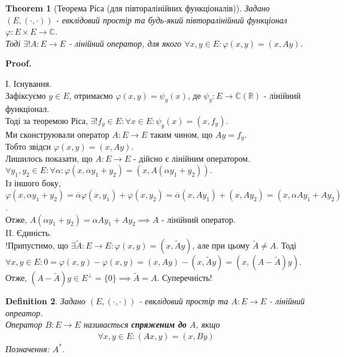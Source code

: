 \documentclass[a4paper, 10pt]{article}
\makeatletter
\def\qed{$\blacksquare$}
\theoremstyle{theoremdd}
\newtheorem{theorem}{Theorem}[subsection]
\theoremstyle{theoremdd}
\newtheorem{definition}[theorem]{Definition}
\theoremstyle{theoremdd}
\theoremstyle{theoremdd}
\theoremstyle{theoremdd}
\theoremstyle{theoremdd}
\theoremstyle{theoremdd}
\theoremstyle{theoremdd}
\renewenvironment{proof}[1][Proof.\\]{\par
\pushQED{\hfill \qed}%
\normalfont \topsep6\p@\@plus6\p@\relax
\trivlist
\item\relax
{\bfseries
#1\@addpunct{.}}\hspace\labelsep\ignorespaces
}{%
\popQED\endtrivlist\@endpefalse
}
\makeatother
\begin{document}
\begin{theorem}[Теорема Ріса (для півторалінійних функціоналів)]
Задано $(E,(\cdot,\cdot))$ - евклідовий простір та будь-який півторалінійний функціонал $\varphi: E \times E \to \mathbb{C}$.\\
Тоді $\exists! A: E \to E$ - лінійний оператор, для якого $\forall x,y \in E: \varphi(x,y) = (x,Ay)$.
\end{theorem}

\begin{proof}
I. Існування.\\
Зафіксуємо $y \in E$, отримаємо $\varphi(x,y) = \psi_y(x)$, де $\psi_y: E \to \mathbb{C} (\mathbb{R})$ - лінійний функціонал.\\
Тоді за теоремою Ріса, $\exists! f_y \in E: \forall x \in E: \psi_y(x) = (x,f_y)$.\\
Ми сконструювали оператор $A: E \to E$ таким чином, що $Ay = f_y$.\\
Тобто звідси $\varphi(x,y) = (x,Ay)$.\\
Лишилось показати, що $A: E \to E$ - дійсно є лінійним оператором.\\
$\forall y_1,y_2 \in E: \forall \alpha: \varphi(x,\alpha y_1 + y_2) = (x,A(\alpha y_1 + y_2))$.\\
Із іншого боку, $\varphi(x,\alpha y_1 + y_2) = \overline{\alpha} \varphi(x,y_1) + \varphi(x,y_2) = \overline{\alpha} (x,Ay_1) + (x,Ay_2) = (x, \alpha Ay_1 + Ay_2)$.\\
Отже, $A(\alpha y_1 + y_2) = \alpha Ay_1 + Ay_2 \implies A$ - лінійний оператор.
\bigskip \\
II. Єдиність.\\
!Припустимо, що $\exists \tilde{A}: E \to E: \varphi(x,y) = (x,\tilde{A}y)$, але при цьому $\tilde{A} \neq A$. Тоді\\
$\forall x,y \in E: 0 = \varphi(x,y) - \varphi(x,y) = (x,Ay) - (x,\tilde{A}y) = (x,(A-\tilde{A})y)$.\\
Отже, $(A-\tilde{A})y \in E^\perp = \{0\} \implies \tilde{A} = A$. Суперечність!
\end{proof}

\begin{definition}
Задано $(E,(\cdot,\cdot))$ - евклідовий простір та $A: E \to E$ - лінійний опреатор.\\
Оператор $B: E \to E$ називається \textbf{спряженим до} $A$, якщо
\begin{align*}
\forall x,y \in E: (Ax,y) = (x,By)
\end{align*}
Позначення: $A^*$.
\end{definition}
\end{document}
